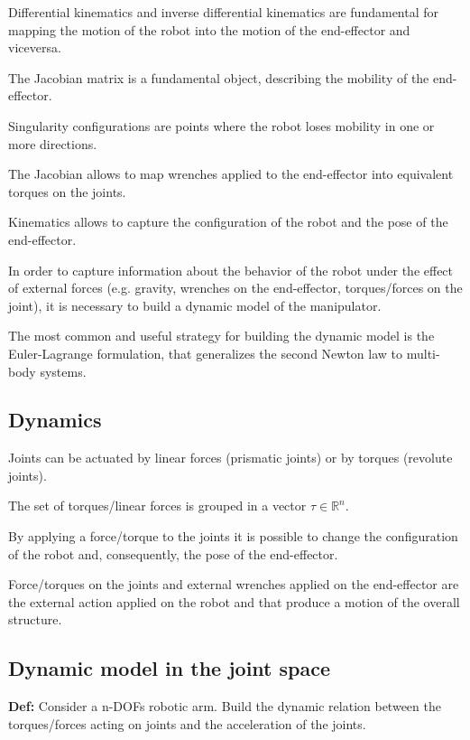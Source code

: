 Differential kinematics and inverse differential kinematics are fundamental for mapping the motion of the robot into the motion of the end-effector and viceversa.
    
The Jacobian matrix is a fundamental object, describing the mobility of the end-effector.
    
Singularity configurations are points where the robot loses mobility in one or more directions.
    
The Jacobian allows to map wrenches applied to the end-effector into equivalent torques on the joints.

\hfill

Kinematics allows to capture the configuration of the robot and the pose of the end-effector.
    
In order to capture information about the behavior of the robot under the effect of external forces (e.g. gravity, wrenches on the end-effector, torques/forces on the joint), it is necessary to build a dynamic model of the manipulator.
    
The most common and useful strategy for building the dynamic model is the Euler-Lagrange formulation, that generalizes the second Newton law to multi-body systems.

\hfill

\subsection{Dynamics}

Joints can be actuated by linear forces (prismatic joints) or by torques (revolute joints).
    
The set of torques/linear forces is grouped in a vector $\tau \in \mathbb{R}^n$.

By applying a force/torque to the joints it is possible to change the configuration of the robot and, consequently, the pose of the end-effector.
    
Force/torques on the joints and external wrenches applied on the end-effector are the external action applied on the robot and that produce a motion of the overall structure.

\hfill

\subsection{Dynamic model in the joint space}

\textbf{Def:} Consider a n-DOFs robotic arm. Build the dynamic relation between the torques/forces acting on joints and the acceleration of the joints.

